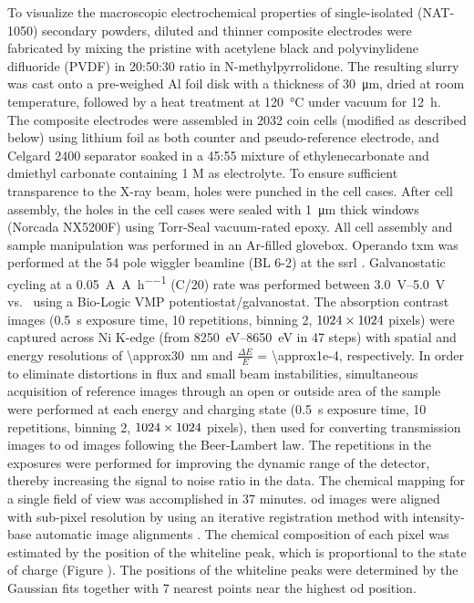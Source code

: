 \documentclass{article}
\begin{document}
To visualize the macroscopic electrochemical properties of
single-isolated \nca{} (NAT-1050) secondary powders, diluted and
thinner composite electrodes were fabricated by mixing the pristine
\nca{} with acetylene black and polyvinylidene difluoride (PVDF) in
20:50:30 ratio in N-methylpyrrolidone. The resulting slurry was cast
onto a pre-weighed Al foil disk with a thickness of
\SI{30}{\micro\meter}, dried at room temperature, followed by a heat
treatment at \SI{120}{\celsius} under vacuum for \SI{12}{\hour}. The
composite electrodes were assembled in 2032 coin cells (modified as
described below) using lithium foil as both counter and
pseudo-reference electrode, and Celgard 2400 separator soaked in a
45:55 mixture of ethylenecarbonate and dmiethyl carbonate containing 1
M  as electrolyte. To ensure sufficient transparence to the
X-ray beam, holes were punched in the cell cases. After cell assembly,
the holes in the cell cases were sealed with \SI{1}{\micro\meter}
thick  windows (Norcada NX5200F) using Torr-Seal
vacuum-rated epoxy. All cell assembly and sample manipulation was
performed in an Ar-filled glovebox. Operando \gls{txm} was performed
at the 54 pole wiggler beamline (BL 6-2) at the \gls{ssrl}
\cite{yun2008}. Galvanostatic cycling at a
\SI{0.05}{\ampere\per\ampere\per\hour} (C/20) rate was performed
between \SIrange{3.0}{5.0}{\volt} vs.\  using a Bio-Logic
VMP potentiostat/galvanostat. The absorption contrast images
(\SI{0.5}{\second} exposure time, 10 repetitions, binning 2, $\rm
1024\times 1024$ pixels) were captured across Ni K-edge (from
\SIrange{8250}{8650}{\electronvolt} in 47 steps) with spatial and
energy resolutions of \SI{\approx30}{\nano\meter} and $\frac{\Delta
  E}{E}$ = \num{\approx1e-4}, respectively. In order to eliminate
distortions in flux and small beam instabilities, simultaneous
acquisition of reference images through an open or outside area of the
sample were performed at each energy and charging state
(\SI{0.5}{\second} exposure time, 10 repetitions, binning 2, $\rm 1024
\times 1024$ pixels), then used for converting transmission images to
\gls{od} images following the Beer-Lambert law. The repetitions in the
exposures were performed for improving the dynamic range of the
detector, thereby increasing the signal to noise ratio in the
data. The chemical mapping for a single field of view was accomplished
in 37 minutes. \Gls{od} images were aligned with sub-pixel resolution
by using an iterative registration method with intensity-base
automatic image alignments \cite{lee2019-3}. The chemical composition
of each pixel was estimated by the position of the whiteline peak,
which is proportional to the state of charge (Figure
). The positions of the whiteline
peaks were determined by the Gaussian fits together with 7 nearest
points near the highest \gls{od} position.
\end{document}
